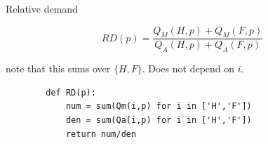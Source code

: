 \documentclass[notes,11pt, aspectratio=169, xcolor=table]{beamer}
\begin{document}
\begin{frame}[fragile=singleslide]{Relative demand}

    \begin{equation*}
        RD(p) = \frac{Q_{M}(H,p) + Q_{M}(F,p)}{Q_{A}(H,p) + Q_{A}(F,p)}
    \end{equation*}

    note that this sums over $\{ H, F \}$. Does not depend on $i$. \\
    
        \begin{verbatim}
        def RD(p):
            num = sum(Qm(i,p) for i in ['H','F'])
            den = sum(Qa(i,p) for i in ['H','F'])
            return num/den
        \end{verbatim}

\end{frame}
\end{document}
